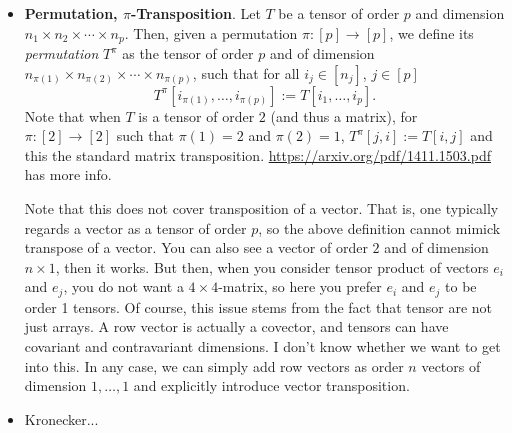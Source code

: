 \begin{itemize}
\item \textbf{Permutation, $\pi$-Transposition}. Let $T$ be a tensor of order $p$ and dimension $n_1\times n_2\times\cdots\times n_p$. Then, given a permutation 
$\pi:[p]\to [p]$, we define its \textit{permutation} $T^\pi$ as the tensor of order $p$ and of dimension
$n_{\pi(1)}\times n_{\pi(2)}\times\cdots\times n_{\pi(p)}$, such that for all $i_j\in[n_j]$, $j\in[p]$
$$
T^{\pi}[i_{\pi(1)},\ldots,i_{\pi(p)}]:=T[i_1,\ldots,i_p].
$$
Note that when $T$ is a tensor of order $2$ (and thus a matrix), for $\pi:[2]\to[2]$ such that $\pi(1)=2$ and $\pi(2)=1$,
$T^\pi[j,i]:=T[i,j]$ and this the standard matrix transposition. \url{https://arxiv.org/pdf/1411.1503.pdf} has more info.

Note that this does not cover transposition of a vector. That is, one typically regards a vector as a tensor of order $p$, so the above definition cannot mimick transpose of a vector. You can also see a vector of order $2$ and of dimension $n\times 1$, then it works. But then, when you consider tensor product of vectors $e_i$ and $e_j$, you do not want a $4\times 4$-matrix, so here you prefer $e_i$ and $e_j$ to be order 1 tensors.
Of course, this issue stems from the fact that tensor are not just arrays. A row vector is actually a covector, and tensors can have covariant and contravariant dimensions. I don't know whether we want to get into this. In any case, we can simply add row vectors as order $n$ vectors of dimension $1,\ldots,1$ and explicitly introduce vector transposition.


\item Kronecker...
 \end{itemize}


